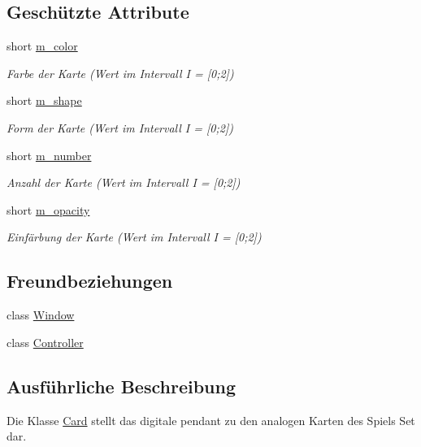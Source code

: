 \subsection*{Geschützte Attribute}
\begin{DoxyCompactItemize}
\item 
short \hyperlink{class_card_af88f3ff917c623a87d6604d1ec57fe33}{m\+\_\+color}
\begin{DoxyCompactList}\small\item\em Farbe der Karte (Wert im Intervall I = \mbox{[}0;2\mbox{]}) \end{DoxyCompactList}\item 
short \hyperlink{class_card_a4e8799ebd7f3faff5c3998c67c106461}{m\+\_\+shape}
\begin{DoxyCompactList}\small\item\em Form der Karte (Wert im Intervall I = \mbox{[}0;2\mbox{]}) \end{DoxyCompactList}\item 
short \hyperlink{class_card_ac4dc3cf042c39c920dda9ea22b9ef751}{m\+\_\+number}
\begin{DoxyCompactList}\small\item\em Anzahl der Karte (Wert im Intervall I = \mbox{[}0;2\mbox{]}) \end{DoxyCompactList}\item 
short \hyperlink{class_card_a9ad7a67add760db09f496f16a8873ad8}{m\+\_\+opacity}
\begin{DoxyCompactList}\small\item\em Einfärbung der Karte (Wert im Intervall I = \mbox{[}0;2\mbox{]}) \end{DoxyCompactList}\end{DoxyCompactItemize}
\subsection*{Freundbeziehungen}
\begin{DoxyCompactItemize}
\item 
class \hyperlink{class_card_a553f958a25683445088050a69d3de8e9}{Window}
\item 
class \hyperlink{class_card_ac3456fd331a58b288082abca310c7a99}{Controller}
\end{DoxyCompactItemize}


\subsection{Ausführliche Beschreibung}
Die Klasse \hyperlink{class_card}{Card} stellt das digitale pendant zu den analogen Karten des Spiels Set dar. 

